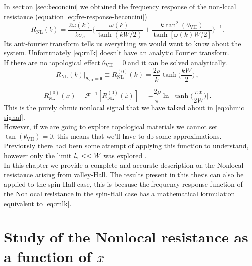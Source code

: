 In section \ref{sec:beconcini} we obtained the frequency response of the non-local resistance (equation \ref{eq:fre-response-beconcini})
\begin{equation}
    R_{\textrm{NL}}(k)=\frac{2\omega(k)}{k\sigma_c}
    \bigg\{
        \frac{\omega(k)}{\tanh(kW/2)} + \frac{k\tan^2(\theta_{\textrm{VH}})}{\tanh[\omega(k)W/2]}    
    \bigg\}^{-1}.
    \label{eq:rnlk}
\end{equation}
Its anti-fourier transform tells us everything we would want to know about the system. Unfortunately \ref{eq:rnlk} doesn't have an analytic Fourier transform.\\ If there are no topological effect $\theta_{\textrm{VH}}=0$ and it can be solved analytically.
\begin{equation}
    R_{\textrm{NL}}(k)|_{\theta_{\textrm{VH}}=0}\equiv R_{\textrm{NL}}^{(0)}(k)=
    \frac{2\rho}k\tanh\bigg(\frac{kW}2\bigg)\,,
    \label{eq:ohmick}
\end{equation}

\begin{equation}
    R_{\textrm{NL}}^{(0)}(x)=
    \mathcal F^{-1}\left[R_{\textrm{NL}}^{(0)}(k) \right]=
    -\frac{2\rho}\pi\ln\bigg |\tanh \Big(\frac{\pi x}{2W}\Big)\bigg |\,.
    \label{eq:ohmic signal2}
\end{equation}
This is the purely ohmic nonlocal signal that we have talked about in \ref{eq:ohmic signal}.\\
However, if we are going to explore topological materials we cannot set $\tan (\theta_{\textrm{VH}})=0$, this means that we'll have to do some approximations.
Previously there had been some attempt of applying this function to understand, however only the limit $l_\textrm v<<W$ was explored \cite{Beconcini_2016}.\\
In this chapter we provide a complete and accurate description on the Nonlocal resistance arising from valley-Hall. The results present in this thesis can also be applied to the spin-Hall case, this is because the frequency response function of the Nonlocal resistance in the spin-Hall case has a mathematical formulation equivalent to \ref{eq:rnlk}.

\section{Study of the Nonlocal resistance as a function of $x$}

